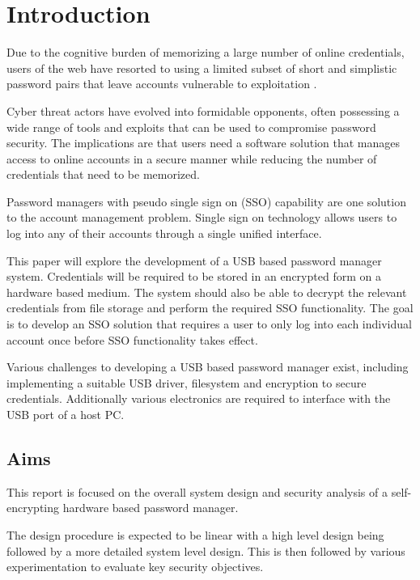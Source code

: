 \section{Introduction}
Due to the cognitive burden of memorizing a large number of online credentials, users of the web have resorted to using a limited subset of short and simplistic password pairs that leave accounts vulnerable to exploitation \cite{user_behaviours}.

Cyber threat actors have evolved into formidable opponents, often possessing a wide range of tools and exploits that can be used to compromise password security. The implications are that users need a software solution that manages access to online accounts in a secure manner while reducing the number of credentials that need to be memorized.

Password managers with pseudo single sign on (SSO) capability are one solution to the account management problem. Single sign on technology allows users to log into any of their accounts through a single unified interface.

This paper will explore the development of a USB based password manager system. Credentials will be required to be stored in an encrypted form on a hardware based medium. The system should also be able to decrypt the relevant credentials from file storage and perform the required SSO functionality. The goal is to develop an SSO solution that requires a user to only log into each individual account once before SSO functionality takes effect.

Various challenges to developing a USB based password manager exist, including implementing a suitable USB driver, filesystem and encryption to secure credentials. Additionally various electronics are required to interface with the USB port of a host PC. 

\subsection{Aims}
This report is focused on the overall system design and security analysis of a self-encrypting hardware based password manager. 

The design procedure is expected to be linear with a high level design being followed by a more detailed system level design. This is then followed by various experimentation to evaluate key security objectives.

